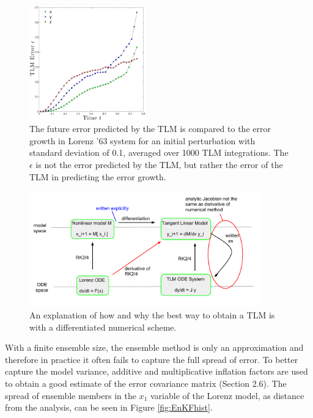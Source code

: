 \begin{figure}
  \centering
  \includegraphics[width=0.45\textwidth]{figures/TLM-verification003_noname.pdf}
  \caption[The future error predicted by the TLM is compared to the error growth in Lorenz '63 system for an initial perturbation with standard deviation of 0.1, averaged over 1000 TLM integrations]{
    The future error predicted by the TLM is compared to the error growth in Lorenz '63 system for an initial perturbation with standard deviation of 0.1, averaged over 1000 TLM integrations.
    The $\epsilon$ is not the error predicted by the TLM, but rather the error of the TLM in predicting the error growth.
  }
  \label{fig:TLMverification}
\end{figure}

\begin{figure}
  \centering
  \includegraphics[width=0.89\textwidth]{figures/TLM-explanation.pdf}
  \caption[An explanation of how and why the best way to obtain a TLM is with a differentiated numerical scheme]{
    An explanation of how and why the best way to obtain a TLM is with a differentiated numerical scheme.
  }
  \label{fig:TLMscheme}
\end{figure}

With a finite ensemble size, the ensemble method is only an approximation and therefore in practice it often fails to capture the full spread of error.
To better capture the model variance, additive and multiplicative inflation factors are used to obtain a good estimate of the error covariance matrix (Section 2.6).
The spread of ensemble members in the $x_1$ variable of the Lorenz model, as distance from the analysis, can be seen in Figure \ref{fig:EnKFhist}.

